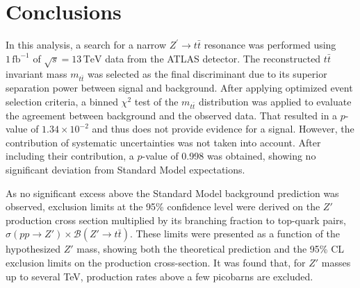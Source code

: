\section*{Conclusions}\label{chap:conclusion}

In this analysis, a search for a narrow \(Z^{\prime} \to t\bar{t}\) resonance was performed using \(1\,\mathrm{fb}^{-1}\) of \(\sqrt{s} = 13\,\mathrm{TeV}\) data from the ATLAS detector. The reconstructed \(t\bar{t}\) invariant mass \(m_{t\bar{t}}\) was selected as the final discriminant due to its superior separation power between signal and background. After applying optimized event selection criteria, a binned \(\chi^2\) test of the \(m_{t\bar{t}}\) distribution was applied to evaluate the agreement between background and the observed data. That resulted in a \(p\)-value of $1.34 \times 10^{-2}$ and thus does not provide
evidence for a signal. However, the contribution of systematic uncertainties was not taken into account. After including their contribution, a \(p\)-value of 0.998 was obtained, showing no significant deviation from Standard Model expectations.

As no significant excess above the Standard Model background prediction was observed, exclusion limits at the 95\% confidence level were derived on the $Z'$ production cross section multiplied by its branching fraction to top-quark pairs, $\sigma(pp \to Z') \times \mathcal{B}(Z' \to t\bar{t})$. These limits were presented as a function of the hypothesized $Z'$ mass, showing both the theoretical prediction and the 95\% CL exclusion limits on the production cross-section. It was found that, for $Z'$ masses
up to several TeV, production rates above a few picobarns are excluded.

